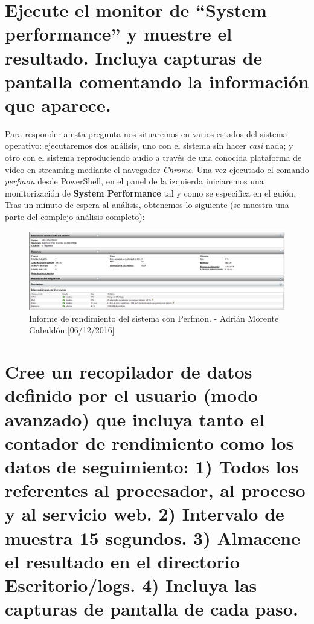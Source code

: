 \section{Ejecute el monitor de ``System performance'' y muestre el resultado. Incluya capturas de pantalla comentando la información que aparece.}
Para responder a esta pregunta nos situaremos en varios estados del sistema operativo: ejecutaremos dos análisis, uno con el sistema sin hacer \textit{casi} nada; y otro con el sistema reproduciendo audio a través de una conocida plataforma de vídeo en streaming mediante el navegador \emph{Chrome}.
Una vez ejecutado el comando \emph{perfmon} desde PowerShell, en el panel de la izquierda iniciaremos una monitorización de \textbf{System Performance} tal y como se especifica en el guión. Tras un minuto de espera al análisis, obtenemos lo siguiente (se muestra una parte del complejo análisis completo):
\begin{figure}[H]
	\centering
	\includegraphics[scale=0.6]{perfmon-1}
	\caption{Informe de rendimiento del sistema con Perfmon. - Adrián Morente Gabaldón [06/12/2016]}
	\label{figura9}
\end{figure}

\section{Cree un recopilador de datos definido por el usuario (modo avanzado) que incluya tanto el contador de rendimiento como los datos de seguimiento: 1) Todos los referentes al procesador, al proceso y al servicio web. 2) Intervalo de muestra 15 segundos. 3) Almacene el resultado en el directorio Escritorio/logs. 4) Incluya las capturas de pantalla de cada paso.}

